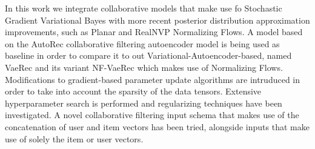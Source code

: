 In this work we integrate collaborative models that make use fo Stochastic Gradient
Variational Bayes with more recent posterior distribution approximation improvements,
such as Planar and RealNVP Normalizing Flows.
A model based on the AutoRec collaborative filtering autoencoder model is being
used as baseline in order to compare it to out Variational-Autoencoder-based, named VaeRec and
its variant NF-VaeRec which makes use of Normalizing Flows.
Modifications to gradient-based parameter update algorithms are intruduced
in order to take into account the sparsity of the data tensors.
Extensive hyperparameter search is performed and regularizing techniques have been investigated.
A novel collaborative filtering input schema that makes use of the concatenation of user 
and item vectors has been tried, alongside inputs that make use of solely the item or user vectors.
